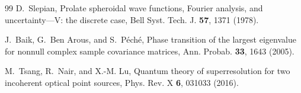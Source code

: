\documentclass[10pt,twocolumn]{article}
\theoremstyle{plain}
\theoremstyle{definition}
\begin{document}
\begin{thebibliography}{99}
D.~Slepian,
Prolate spheroidal wave functions, Fourier analysis, and uncertainty---V:
the discrete case, Bell Syst. Tech. J. \textbf{57}, 1371 (1978).

J.~Baik, G.~Ben Arous, and S.~P\'ech\'e,
Phase transition of the largest eigenvalue for nonnull complex sample covariance
matrices, Ann. Probab. \textbf{33}, 1643 (2005).

M.~Tsang, R.~Nair, and X.-M. Lu,
Quantum theory of superresolution for two incoherent optical point sources,
Phys. Rev. X \textbf{6}, 031033 (2016).

\end{thebibliography}
\end{document}
